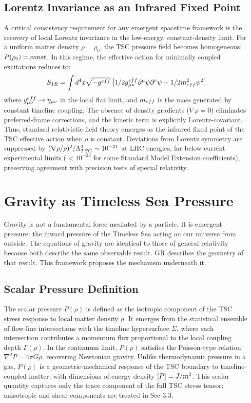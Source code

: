 \documentclass[11pt,a4paper]{article}
\def\frac#1#2{#1/#2} \def\phantom#1{} \def\ensuremath#1{#1}
\let\text\relax \let\mathrm\relax \let\mathbf\relax \let\mathcal\relax
\begin{document}
\subsection{Lorentz Invariance as an Infrared Fixed Point}
A critical consistency requirement for any emergent spacetime framework is the recovery of local Lorentz invariance in the low-energy, constant-density limit. For a uniform matter density $\rho = \rho_0$, the TSC pressure field becomes homogeneous: $P(\rho_0) = \text{const}$. In this regime, the effective action for minimally coupled excitations reduces to:
\begin{equation}
S_{\text{IR}} = \int d^4x \sqrt{-g^{\text{eff}}} \left[ \frac{1}{2} g^{\text{eff}}_{\mu\nu} \partial^\mu \psi \partial^\nu \psi - \frac{1}{2} m_{\text{eff}}^2 \psi^2 \right]
\end{equation}
where $g^{\text{eff}}_{\mu\nu} \to \eta_{\mu\nu}$ in the local flat limit, and $m_{\text{eff}}$ is the mass generated by constant timeline coupling. The absence of density gradients ($\nabla \rho = 0$) eliminates preferred-frame corrections, and the kinetic term is explicitly Lorentz-covariant. Thus, standard relativistic field theory emerges as the infrared fixed point of the TSC effective action when $\rho$ is constant. Deviations from Lorentz symmetry are suppressed by $(\nabla \rho / \rho)^2 / \Lambda_{\text{TSC}}^2 \sim 10^{-21}$ at LHC energies, far below current experimental limits ($<10^{-23}$ for some Standard Model Extension coefficients), preserving agreement with precision tests of special relativity.

\section{Gravity as Timeless Sea Pressure}
Gravity is not a fundamental force mediated by a particle. It is emergent pressure: the inward pressure of the Timeless Sea acting on our universe from outside. The equations of gravity are identical to those of general relativity because both describe the same observable result. GR describes the geometry of that result. This framework proposes the mechanism underneath it.

\subsection{Scalar Pressure Definition}
The scalar pressure $P(\rho)$ is defined as the isotropic component of the TSC stress response to local matter density $\rho$. It emerges from the statistical ensemble of flow-line intersections with the timeline hypersurface $\Sigma$, where each intersection contributes a momentum flux proportional to the local coupling depth $\Gamma(\rho)$. In the continuum limit, $P(\rho)$ satisfies the Poisson-type relation $\nabla^2 P = 4\pi G \rho$, recovering Newtonian gravity. Unlike thermodynamic pressure in a gas, $P(\rho)$ is a geometric-mechanical response of the TSC boundary to timeline-coupled matter, with dimensions of energy density $[P] = \text{J}/\text{m}^3$. This scalar quantity captures only the trace component of the full TSC stress tensor; anisotropic and shear components are treated in Sec 3.3.
\end{document}
